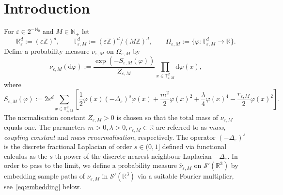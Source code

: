 \documentclass{article}
\numberwithin{equation}{section}
\newcommand{\assign}{:=}
\newcommand{\mathd}{\mathrm{d}}
\theoremstyle{plain}
\theoremstyle{definition}
\begin{document}
\maketitle

{\small\tableofcontents}

\section{Introduction}\label{sec:intro}

For $\varepsilon \in 2^{-\mathbb{N}_0}$ and $M \in
\mathbb{N}_+$ let
\[ \mathbb{R}_{\varepsilon}^d \assign (\varepsilon \mathbb{Z})^d, \qquad
   \mathbb{T}_{\varepsilon, M}^d \assign (\varepsilon
   \mathbb{Z})^d / (M\mathbb{Z})^d, \qquad \Omega_{\varepsilon, M} \assign \{
   \varphi : \mathbb{T}_{\varepsilon, M}^d \rightarrow \mathbb{R} \} . \]
Define a probability measure $\nu_{\varepsilon, M}$ on $\Omega_{\varepsilon,
M}$ by
\begin{equation}
  \nu_{\varepsilon, M} (\mathd \varphi) \assign \frac{\exp (- S_{\varepsilon,
  M} (\varphi))}{Z_{\varepsilon, M}} \prod_{x \in \mathbb{T}_{\varepsilon,
  M}^d} \mathd \varphi (x) \label{eq:measure},
\end{equation}
where
\begin{equation}
  S_{\varepsilon, M} (\varphi) \assign 2 \varepsilon^d  \sum_{x \in
  \mathbb{T}_{\varepsilon, M}^d} \left[ \frac{1}{2} \varphi (x)  (-
  \Delta_{\varepsilon})^s \varphi (x) + \frac{m^2}{2} \varphi (x)^2 +
  \frac{\lambda}{4} \varphi (x)^4 - \frac{r_{\varepsilon, M}}{2} \varphi (x)^2
  \right]. \label{eq:action}
\end{equation}
The normalisation constant $Z_{\varepsilon, M} > 0$ is chosen so that the
total mass of $\nu_{\varepsilon, M}$ equals one. The parameters $m > 0,
  \lambda > 0, r_{\varepsilon, M} \in \mathbb{R}$ are referred to as
\textit{mass}, \textit{coupling constant} and \textit{mass
renormalisation}, respectively. The operator $(- \Delta_{\varepsilon})^s$ is
the discrete fractional Laplacian of order $s \in (0, 1]$ defined via
functional calculus as the $s$-th power of the discrete nearest-neighbour
Laplacian $- \Delta_{\varepsilon}$. In order to pass to the limit, we define a
probability measure $\hat{\nu}_{\varepsilon, M}$ on $\mathcal{S}'
(\mathbb{R}^3)$ by embedding sample paths of $\nu_{\varepsilon, M}$ in
$\mathcal{S}' (\mathbb{R}^3)$ via a suitable Fourier multiplier,
see~\eqref{eq:embedding} below.
\end{document}
